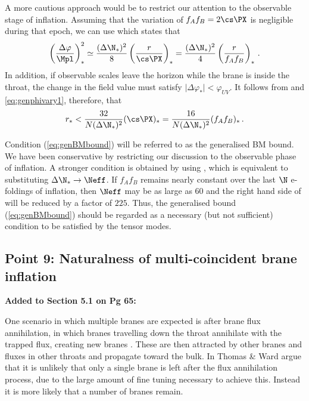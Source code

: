 A more cautious approach would be to restrict our attention to 
the observable stage of inflation.
Assuming that the variation
of $f_Af_B = 2 \cs\PX$ is negligible during that epoch, we can use
 which states that 
% 
\begin{equation}
\label{eq:genphivary1}
\left( \frac{\Delta \varphi}{\Mpl} \right)^2_{*} \simeq 
\frac{(\Delta \N_{*} )^2}{8} \left(\frac{r}{\cs\PX}\right)_*  
= \frac{(\Delta \N_{*} )^2}{4} \left(\frac{r}{f_A f_B}\right)_*  \,.
\end{equation}
% 
In addition, 
if observable scales leave the horizon 
while the brane is inside the throat, the change in the field value 
must satisfy $| \Delta \varphi_*|<\varphi_{UV}$. It follows from  and
\eqref{eq:genphivary1}, therefore, that 
% 
\begin{equation}
\label{eq:genBMbound}
r_*< \frac{32}{N (\Delta \N_{*})^2} (\cs\PX)_* = \frac{16}{N (\Delta \N_{*})^2}
(f_Af_B)_* \,.
\end{equation}
% 

Condition 
(\ref{eq:genBMbound}) will be referred to as the 
generalised BM bound. 
We have been
conservative by restricting our discussion to the 
observable phase of inflation. A stronger condition is obtained by using
, which is equivalent to substituting $\Delta \N_* \rightarrow 
\Neff$. If 
$f_Af_B$ remains nearly constant over the last $\N$ 
e-foldings of inflation, 
then $\Neff$ may be as large as $60$ and the right hand side of  will be reduced
by a factor of $225$. 
Thus, the generalised bound 
(\ref{eq:genBMbound}) should be regarded as a necessary 
(but not sufficient) condition to be satisfied by the tensor modes.


\subsection{Point 9: Naturalness of multi-coincident brane inflation}
\textbf{Added to Section 5.1 on Pg 65:}

One scenario in which multiple branes are expected is after brane flux annihilation, in which
branes travelling down the throat annihilate with the trapped flux, creating new branes
\cite{thomasward, DeWolfe:2004qx, Kachru:2002gs}. These are then attracted by other branes and
fluxes in other throats and propagate toward the bulk.
In  Thomas \& Ward argue that it is unlikely that only a single brane is left
after the flux annihilation process, due to the large amount of fine tuning necessary to achieve
this. Instead it is more likely that a number of branes remain.


